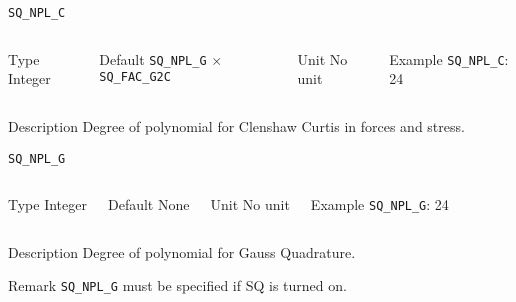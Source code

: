 \begin{frame}[allowframebreaks]{\texttt{SQ\_NPL\_C}} \label{SQ_NPL_C}
\vspace*{-12pt}
\begin{columns}
\begin{block}{Type}
Integer
\end{block}

\begin{block}{Default}
\texttt{SQ\_NPL\_G} $\times$ \texttt{SQ\_FAC\_G2C}
\end{block}

\begin{block}{Unit}
No unit
\end{block}

\begin{block}{Example}
\texttt{SQ\_NPL\_C}: 24
\end{block}
\end{columns}

\begin{block}{Description}
Degree of polynomial for Clenshaw Curtis in forces and stress. 
\end{block}

\end{frame}


\begin{frame}[allowframebreaks]{\texttt{SQ\_NPL\_G}} \label{SQ_NPL_G}
\vspace*{-12pt}
\begin{columns}
\begin{block}{Type}
Integer
\end{block}

\begin{block}{Default}
None
\end{block}

\begin{block}{Unit}
No unit
\end{block}

\begin{block}{Example}
\texttt{SQ\_NPL\_G}: 24
\end{block}
\end{columns}

\begin{block}{Description}
Degree of polynomial for Gauss Quadrature.
\end{block}

\begin{block}{Remark}
\texttt{SQ\_NPL\_G} must be specified if SQ is turned on.
\end{block}

\end{frame}





